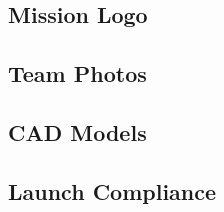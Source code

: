 \subsection{Mission Logo}
\subsection{Team Photos}
\subsection{CAD Models}
\subsection{Launch Compliance}

